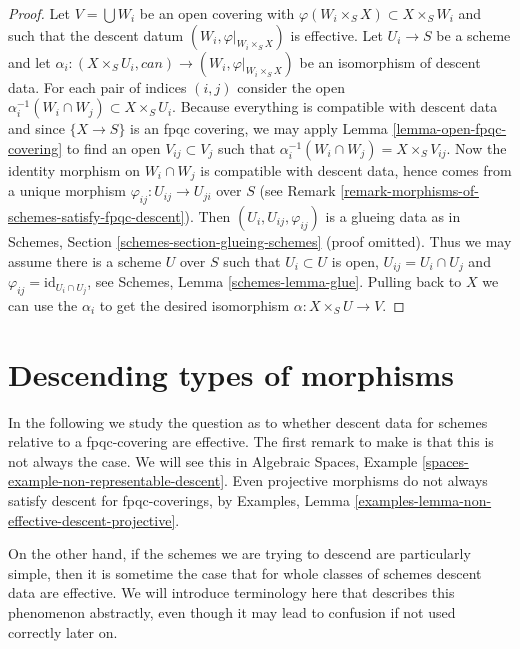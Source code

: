 \begin{proof}
Let $V = \bigcup W_i$ be an open covering with
$\varphi(W_i \times_S X) \subset X \times_S W_i$
and such that the descent datum $(W_i, \varphi|_{W_i \times_S X})$
is effective. Let $U_i \to S$ be a scheme and let
$\alpha_i : (X \times_S U_i, can) \to (W_i, \varphi|_{W_i \times_S X})$
be an isomorphism of descent data. For each pair of indices
$(i, j)$ consider the open
$\alpha_i^{-1}(W_i \cap W_j) \subset X \times_S U_i$.
Because everything is compatible with descent data
and since $\{X \to S\}$ is an fpqc covering, we
may apply Lemma \ref{lemma-open-fpqc-covering}
to find an open $V_{ij} \subset V_j$ such that
$\alpha_i^{-1}(W_i \cap W_j) = X \times_S V_{ij}$.
Now the identity morphism on $W_i \cap W_j$ is
compatible with descent data, hence comes from a
unique morphism $\varphi_{ij} : U_{ij} \to U_{ji}$ over $S$
(see Remark \ref{remark-morphisms-of-schemes-satisfy-fpqc-descent}).
Then $(U_i, U_{ij}, \varphi_{ij})$ is a glueing
data as in Schemes, Section \ref{schemes-section-glueing-schemes}
(proof omitted). Thus we may assume there is a scheme $U$ over $S$
such that $U_i \subset U$ is open, $U_{ij} = U_i \cap U_j$ and
$\varphi_{ij} = \text{id}_{U_i \cap U_j}$, see
Schemes, Lemma \ref{schemes-lemma-glue}.
Pulling back to $X$ we can use the $\alpha_i$ to
get the desired isomorphism $\alpha : X \times_S U \to V$.
\end{proof}







\section{Descending types of morphisms}
\label{section-descending-types-morphisms}

\noindent
In the following we study the question as to whether
descent data for schemes relative to a fpqc-covering
are effective. The first remark to make is that this
is not always the case. We will see this in Algebraic
Spaces, Example \ref{spaces-example-non-representable-descent}.
Even projective morphisms do not always satisfy descent
for fpqc-coverings, by Examples,
Lemma \ref{examples-lemma-non-effective-descent-projective}.

\medskip\noindent
On the other hand, if the schemes we are trying to
descend are particularly simple, then it is sometime the
case that for whole classes of schemes descent data
are effective. We will introduce terminology here that
describes this phenomenon abstractly, even though it
may lead to confusion if not used correctly later on.

